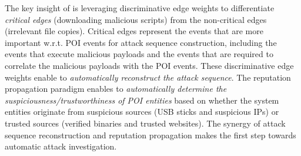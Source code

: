 The key insight of \tool is leveraging discriminative edge weights to differentiate  \emph{critical edges} (\eg downloading malicious scripts)
from the non-critical edges (\eg irrelevant file copies).
Critical edges represent the events that are more important w.r.t. POI events for attack sequence construction, including the events that execute malicious payloads and the events that are required to correlate the malicious payloads with the POI events.
These discriminative edge weights enable \tool to \emph{automatically reconstruct the attack sequence}.
The reputation propagation paradigm enables \tool to \emph{automatically determine the suspiciousness/trustworthiness of POI entities} based on whether the system entities originate from suspicious sources (\eg USB sticks and suspicious IPs) or trusted sources (\eg verified binaries and trusted websites).
The synergy of attack sequence reconstruction and reputation propagation makes \tool the first step towards automatic attack investigation. 


